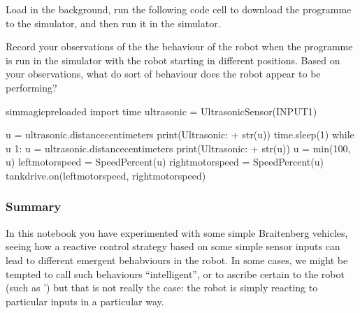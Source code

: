 \documentclass[letterpaper,10pt,english]{sphinxmanual}
\begin{document}
{Load in the  background, run the following code cell to download the programme to the simulator, and then run it in the simulator.

Record your observations of the the behaviour of the robot when the programme is run in the simulator with the robot starting in different positions. Based on your observations, what do sort of behaviour does the robot appear to be performing?

{
\begin{sphinxVerbatim}[commandchars=\\\{\}]
\llap{\color{nbsphinxin}[ ]:\,\hspace{\fboxrule}\hspace{\fboxsep}}\PYGZpc{}\PYGZpc{}sim\PYGZus{}magic\PYGZus{}preloaded
import time
ultrasonic = UltrasonicSensor(INPUT\PYGZus{}1)

u = ultrasonic.distance\PYGZus{}centimeters
print(\PYGZsq{}Ultrasonic: \PYGZsq{} + str(u))
time.sleep(1)
while  u \PYGZgt{} 1:
    u = ultrasonic.distance\PYGZus{}centimeters
    print(\PYGZsq{}Ultrasonic: \PYGZsq{} + str(u))
    u = min(100, u)
    left\PYGZus{}motor\PYGZus{}speed = SpeedPercent(u)
    right\PYGZus{}motor\PYGZus{}speed = SpeedPercent(u)
    tank\PYGZus{}drive.on(left\PYGZus{}motor\PYGZus{}speed, right\PYGZus{}motor\PYGZus{}speed)

\end{sphinxVerbatim}
}







\subsubsection{Summary}
\label{\detokenize{content/03_Robot_Lab/Section_00_03:Summary}}
In this notebook you have experimented with some simple Braitenberg vehicles, seeing how a reactive control strategy based on some simple sensor inputs can lead to different emergent behabviours in the robot. In some cases, we might be tempted to call such behaviours “intelligent”, or to ascribe certain  to the robot (such as ’) but that is not really the case: the robot is simply reacting to particular inputs in a particular way.

}
\end{document}
